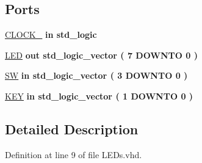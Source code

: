 \subsection*{Ports}
 \begin{DoxyCompactItemize}
\item 
\hyperlink{class_l_e_ds_a4b5e1e3eba67b2e61c77c9a719d8518c}{C\+L\+O\+C\+K\+\_}  {\bfseries {\bfseries \textcolor{keywordflow}{in}\textcolor{vhdlchar}{ }}} {\bfseries \textcolor{comment}{std\+\_\+logic}\textcolor{vhdlchar}{ }} 
\item 
\hyperlink{class_l_e_ds_a424944084857f6787a0ddb567d0b5240}{L\+E\+D}  {\bfseries {\bfseries \textcolor{keywordflow}{out}\textcolor{vhdlchar}{ }}} {\bfseries \textcolor{comment}{std\+\_\+logic\+\_\+vector}\textcolor{vhdlchar}{ }\textcolor{vhdlchar}{(}\textcolor{vhdlchar}{ }\textcolor{vhdlchar}{ } \textcolor{vhdldigit}{7} \textcolor{vhdlchar}{ }\textcolor{keywordflow}{D\+O\+W\+N\+T\+O}\textcolor{vhdlchar}{ }\textcolor{vhdlchar}{ } \textcolor{vhdldigit}{0} \textcolor{vhdlchar}{ }\textcolor{vhdlchar}{)}\textcolor{vhdlchar}{ }} 
\item 
\hyperlink{class_l_e_ds_a30974727c81621f672f7f9490463f9d3}{S\+W}  {\bfseries {\bfseries \textcolor{keywordflow}{in}\textcolor{vhdlchar}{ }}} {\bfseries \textcolor{comment}{std\+\_\+logic\+\_\+vector}\textcolor{vhdlchar}{ }\textcolor{vhdlchar}{(}\textcolor{vhdlchar}{ }\textcolor{vhdlchar}{ } \textcolor{vhdldigit}{3} \textcolor{vhdlchar}{ }\textcolor{keywordflow}{D\+O\+W\+N\+T\+O}\textcolor{vhdlchar}{ }\textcolor{vhdlchar}{ } \textcolor{vhdldigit}{0} \textcolor{vhdlchar}{ }\textcolor{vhdlchar}{)}\textcolor{vhdlchar}{ }} 
\item 
\hyperlink{class_l_e_ds_aa70bf9245705f33e4529eb81df3fbf94}{K\+E\+Y}  {\bfseries {\bfseries \textcolor{keywordflow}{in}\textcolor{vhdlchar}{ }}} {\bfseries \textcolor{comment}{std\+\_\+logic\+\_\+vector}\textcolor{vhdlchar}{ }\textcolor{vhdlchar}{(}\textcolor{vhdlchar}{ }\textcolor{vhdlchar}{ } \textcolor{vhdldigit}{1} \textcolor{vhdlchar}{ }\textcolor{keywordflow}{D\+O\+W\+N\+T\+O}\textcolor{vhdlchar}{ }\textcolor{vhdlchar}{ } \textcolor{vhdldigit}{0} \textcolor{vhdlchar}{ }\textcolor{vhdlchar}{)}\textcolor{vhdlchar}{ }} 
\end{DoxyCompactItemize}


\subsection{Detailed Description}


Definition at line 9 of file L\+E\+Ds.\+vhd.




